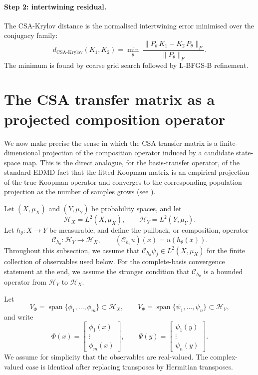 \documentclass{article}
\theoremstyle{definition}
\begin{document}
\paragraph{Step 2: intertwining residual.}
The CSA-Krylov distance is the normalised intertwining error minimised over
the conjugacy family:
\begin{equation}\label{eq:CSA_krylov}
  d_{\mathrm{CSA\text{-}Krylov}}(K_1, K_2)
    = \min_\theta \;
      \frac{\lVert P_\theta\,K_1 - K_2\,P_\theta \rVert_F}
           {\lVert P_\theta \rVert_F}.
\end{equation}
The minimum is found by coarse grid search followed by L-BFGS-B refinement.


\section{The CSA transfer matrix as a projected composition operator}
\label{app:CSA_projected_composition_operator}

We now make precise the sense in which the CSA transfer matrix is a finite-dimensional
projection of the composition operator induced by a candidate state-space map. This is the
direct analogue, for the basis-transfer operator, of the standard EDMD fact that the fitted
Koopman matrix is an empirical projection of the true Koopman operator and converges to
the corresponding population projection as the number of samples grows (see \citep{korda2018convergence}).

Let $(X,\mu_X)$ and $(Y,\mu_Y)$ be probability spaces, and let
\[
\mathcal H_X=L^2(X,\mu_X),\qquad
\mathcal H_Y=L^2(Y,\mu_Y).
\]
Let $h_\theta:X\to Y$ be measurable, and define the pullback, or composition, operator
\[
\mathcal C_{h_\theta}:\mathcal H_Y\to \mathcal H_X,
\qquad
(\mathcal C_{h_\theta}u)(x)=u(h_\theta(x)).
\]
Throughout this subsection, we assume that $\mathcal C_{h_\theta}\psi_j\in L^2(X,\mu_X)$ for the
finite collection of observables used below. For the complete-basis convergence statement
at the end, we assume the stronger condition that $\mathcal C_{h_\theta}$ is a bounded operator from
$\mathcal H_Y$ to $\mathcal H_X$.

Let
\[
V_\Phi=\operatorname{span}\{\phi_1,\ldots,\phi_m\}\subset \mathcal H_X,
\qquad
V_\Psi=\operatorname{span}\{\psi_1,\ldots,\psi_n\}\subset \mathcal H_Y,
\]
and write
\[
\Phi(x)=
\begin{bmatrix}
\phi_1(x)\\
\vdots\\
\phi_m(x)
\end{bmatrix},
\qquad
\Psi(y)=
\begin{bmatrix}
\psi_1(y)\\
\vdots\\
\psi_n(y)
\end{bmatrix}.
\]
We assume for simplicity that the observables are real-valued. The complex-valued case is
identical after replacing transposes by Hermitian transposes.
\end{document}
